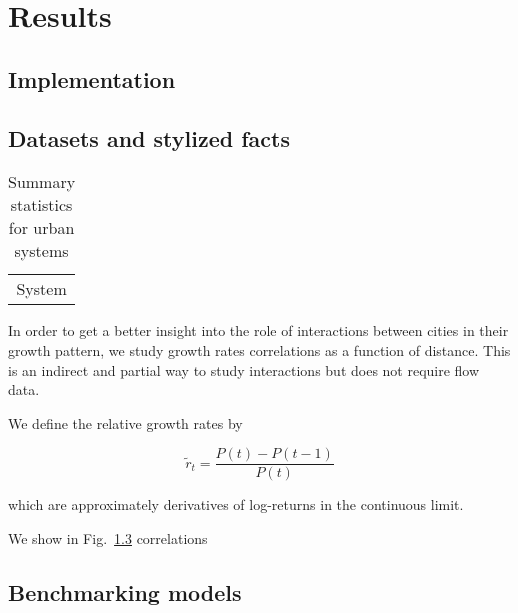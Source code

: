 \documentclass[alpha-refs]{wiley-article}
\begin{document}




\section{Results}

\subsection{Implementation}


\subsection{Datasets and stylized facts}



\begin{table}
	\caption{Summary statistics for urban systems}
	\begin{tabular}{|c|}
		System \\
	\end{tabular}
\end{table}




In order to get a better insight into the role of interactions between cities in their growth pattern, we study growth rates correlations as a function of distance. This is an indirect and partial way to study interactions but does not require flow data.

We define the relative growth rates by

\[
\tilde{r}_t = \frac{P(t) - P(t-1)}{P(t)}
\]

which are approximately derivatives of log-returns in the continuous limit.

We show in Fig.~\ref{} correlations 


\begin{figure}
	\caption{}
\end{figure}



\subsection{Benchmarking models}
\end{document}
